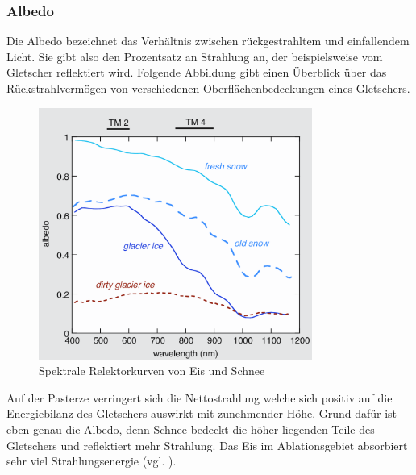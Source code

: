 \documentclass[12pt,a4paper]{article}
\begin{document}
\subsubsection{Albedo}\label{Albedo}
Die Albedo bezeichnet das Verhältnis zwischen rückgestrahltem und einfallendem Licht. Sie gibt also den Prozentsatz an Strahlung an, der beispielsweise vom Gletscher reflektiert wird. Folgende Abbildung gibt einen Überblick über das Rückstrahlvermögen von verschiedenen Oberflächenbedeckungen eines Gletschers.

\begin{figure}[H]
\centering
\includegraphics[width=0.8\textwidth]{pictures/spectral_reflectance_curves_for_ice_and_snow.png}
\caption[Spektrale Relektorkurven von Eis und Schnee]{Spektrale Relektorkurven von Eis und Schnee \parencite{Themicroclimateofvalleyglaciers}}
\label{fig:Spektrale Relektorkurven von Eis und Schnee}
\end{figure}

Auf der Pasterze verringert sich die Nettostrahlung welche sich positiv auf die Energiebilanz des Gletschers auswirkt mit zunehmender Höhe. Grund dafür ist eben genau die Albedo, denn Schnee bedeckt die höher liegenden Teile des Gletschers und reflektiert mehr Strahlung. Das Eis im Ablationsgebiet absorbiert sehr viel Strahlungsenergie (vgl. \cite[171]{ThePhysicsOfGlaciers}).
\end{document}
